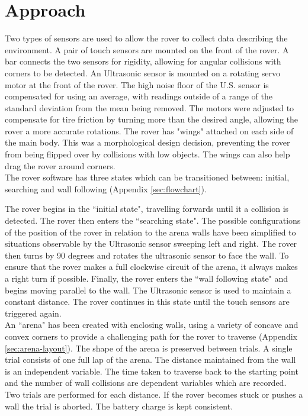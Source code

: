 \documentclass[a4paper,12pt,twocolumn]{article}
\begin{document}
\section{Approach}
Two types of sensors are used to allow the rover to collect data describing the environment. A pair of touch sensors are mounted on the front of the rover. A bar connects the two sensors for rigidity, allowing for angular collisions with corners to be detected. An Ultrasonic sensor is mounted on a rotating servo motor at the front of the rover. The high noise floor of the U.S. sensor is compensated for using an average, with readings outside of a range of the standard deviation from the mean being removed. The motors were adjusted to compensate for tire friction by turning more than the desired angle, allowing the rover a more accurate rotations. The rover has "wings" attached on each side of the main body. This was a morphological design decision, preventing the rover from being flipped over by collisions with low objects. The wings can also help drag the rover around corners.\\

The rover software has three states which can be transitioned between: initial, searching and wall following (Appendix \ref{sec:flowchart}).

The rover begins in the ``initial state", travelling forwards until it a collision is detected. The rover then enters the ``searching state". The possible configurations of the position of the rover in relation to the arena walls have been simplified to situations observable by the Ultrasonic sensor sweeping left and right.
The rover then turns by 90 degrees and rotates the ultrasonic sensor to face the wall. 
To ensure that the rover makes a full clockwise circuit of the arena, it always makes a right turn if possible.
Finally, the rover enters the ``wall following state" and begins moving parallel to the wall. The Ultrasonic sensor is used to maintain a constant distance. The rover continues in this state until the touch sensors are triggered again.\\

An ``arena" has been created with enclosing walls, using a variety of concave and convex corners to provide a challenging path for the rover to traverse (Appendix \ref{sec:arena-layout}). The shape of the arena is preserved between trials. A single trial consists of one full lap of the arena. The distance maintained from the wall is an independent variable. The time taken to traverse back to the starting point and the number of wall collisions are dependent variables which are recorded. Two trials are performed for each distance. If the rover becomes stuck or pushes a wall the trial is aborted. The battery charge is kept consistent.
\end{document}

